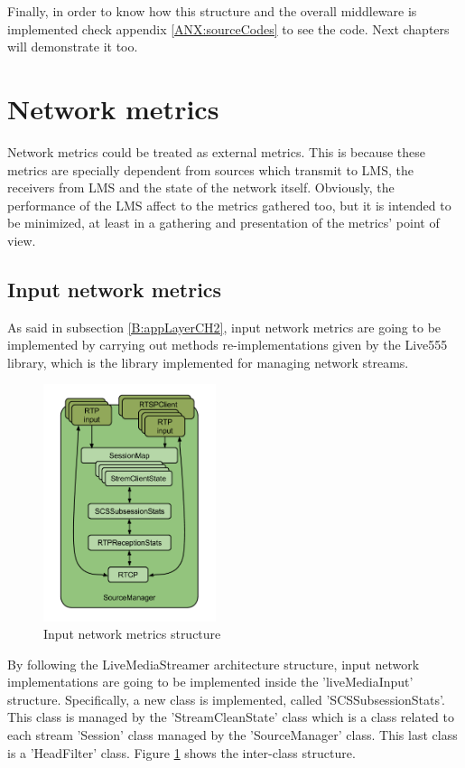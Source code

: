 Finally, in order to know how this structure and the overall middleware is implemented check appendix \ref{ANX:sourceCodes} to see the code. Next chapters will demonstrate it too.

\section{Network metrics}

Network metrics could be treated as external metrics. This is because these metrics are specially dependent from sources which transmit to LMS, the receivers from LMS and the state of the network itself. Obviously, the performance of the LMS affect to the metrics gathered too, but it is intended to be minimized, at least in a gathering and presentation of the metrics' point of view.

\subsection{Input network metrics}

As said in subsection \ref{B:appLayerCH2}, input network metrics are going to be implemented by carrying out methods re-implementations given by the Live555 library, which is the library implemented for managing network streams.  

\begin{figure}[!htb]
\begin{center}
\includegraphics[width=0.45\textwidth]{./images/SourceManager.png}
\caption{Input network metrics structure}
\label{F:inms}
\end{center}
\end{figure}

By following the LiveMediaStreamer architecture structure, input network implementations are going to be implemented inside the 'liveMediaInput' structure. Specifically, a new class is implemented, called 'SCSSubsessionStats'. This class is managed by the 'StreamCleanState' class which is a class related to each stream 'Session' class managed by the 'SourceManager' class. This last class is a 'HeadFilter' class. Figure \ref{F:inms} shows the inter-class structure.

